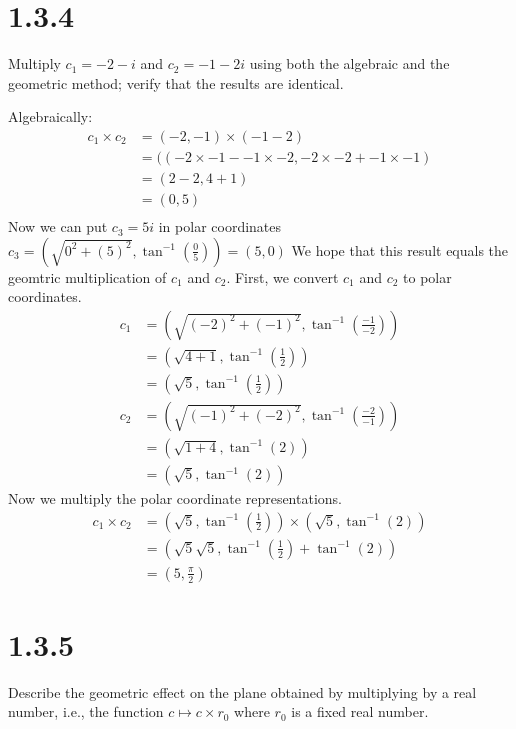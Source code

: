 \documentclass[11pt]{article}
\begin{document}

\section{1.3.4}
Multiply $c_1 = -2 - i$ and $c_2 = -1 - 2i$ using both the algebraic and the geometric method; verify that the results are identical.

Algebraically: 
\begin{align*}
	c_1 \times c_2 &= (-2, -1) \times (-1 -2) \\
		       &= ((-2\times -1 - -1 \times -2 , -2\times-2 + -1 \times -1) \\
		       &= (2-2,4+1)\\
		       &= (0,5) \\
\end{align*}
Now we can put $c_3 = 5i$ in polar coordinates $c_3 = (\sqrt{0^2 + (5)^2}, \tan^{-1}(\frac{0}{5})) = (5, 0)$
We hope that this result equals the geomtric multiplication of $c_1$ and $c_2$. 
First, we convert $c_1$ and $c_2$ to polar coordinates.
\begin{align*}
	c_1 &= (\sqrt{(-2)^2 + (-1)^2}, \tan^{-1}(\frac{-1}{-2}))   \\
	    &= (\sqrt{4 + 1}, \tan^{-1}(\frac{1}{2})) \\
	    &= (\sqrt{5}, \tan^{-1}(\frac{1}{2}))
\end{align*}
\begin{align*}
	c_2 &= (\sqrt{(-1)^2 + (-2)^2}, \tan^{-1}(\frac{-2}{-1}))  \\
	    &= (\sqrt{1 + 4}, \tan^{-1}(2))  \\
	    &= (\sqrt{5}, \tan^{-1}(2))
\end{align*}
Now we multiply the polar coordinate representations.
\begin{align*}
	c_1 \times c_2 &= (\sqrt{5}, \tan^{-1}(\frac{1}{2})) \times (\sqrt{5}, \tan^{-1}(2)) \\
	               &= (\sqrt{5}\sqrt{5}, \tan^{-1}(\frac{1}{2}) + \tan^{-1}(2)) \\
		       &= (5, \frac{\pi}{2})
\end{align*}

\section{1.3.5}
Describe the geometric effect on the plane obtained by multiplying by a real number, i.e., the function $c \mapsto  c \times r_0$ where $r_0$ is a fixed real number.
\end{document}
